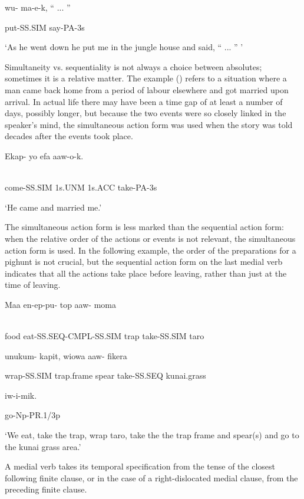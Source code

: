 wu-  ma-e-k,  `` ... ''

put-SS.SIM  say-PA-3s

`As he went down he put me in the jungle house and said, `` ... '' '

Simultaneity vs. sequentiality is not always a choice between absolutes; sometimes it is a relative matter. The example () refers to a situation where a man came back home from a period of labour elsewhere and got married upon arrival. In actual life there may have been a time gap of at least a number of days, possibly longer, but because the two events were so closely linked in the speaker's mind, the simultaneous action form was used when the story was told decades after the events took place.

\ea%
\label{ex:x1433}
\gll Ekap-  yo  efa  aaw-o-k. \\
      \\
\glt
\z

come-SS.SIM  1s.UNM  1s.ACC  take-PA-3s

`He came and married me.'

The simultaneous action form is less marked than the sequential action form: when the relative order of the actions or events is not relevant, the simultaneous action form is used. In the following example, the order of the preparations for a pighunt is not crucial, but the sequential action form on the last medial verb indicates that all the actions take place before leaving, rather than just at the time of leaving.  

\ea%
\label{ex:x1437}
\gll Maa  en-ep-pu-  top  aaw-  moma  \\
      \\
\glt
\z

food  eat-SS.SEQ-CMPL-SS.SIM  trap  take-SS.SIM  taro

unukum-  kapit,  wiowa  aaw-  fikera

wrap-SS.SIM  trap.frame  spear  take-SS.SEQ  kunai.grass

iw-i-mik.

go-Np-PR.1/3p

`We eat, take the trap, wrap taro, take the the trap frame and spear(s) and go to the kunai grass area.'

A medial verb takes its temporal specification from the tense of the closest following finite clause, or in the case of a right-dislocated medial clause, from the preceding finite clause.

